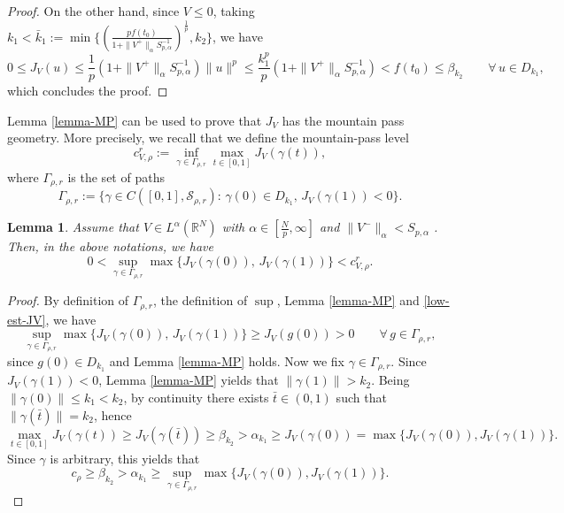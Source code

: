 \documentclass[11pt,reqno]{amsart}
\newtheorem{lemma}[theorem]{Lemma}
\theoremstyle{definition}
\numberwithin{equation}{section}
\numberwithin{theorem}{section}
\numberwithin{equation}{section}
\numberwithin{theorem}{section}
\newcommand{\R}{\mathbb{R}}
\begin{document}
\begin{proof}
On the other hand, since $V\le 0$, taking $k_1<\bar{k}_1:=\min\{(\frac{pf(t_0)}{1+\|V^+\|_\alpha S^{-1}_{p,\alpha}})^{\frac{1}{p}},k_2\}$, we have
\begin{equation}\label{low-est-J}
0\le J_V(u)\le \frac{1}{p}(1+\|V^+\|_\alpha S^{-1}_{p,\alpha})\|u\|^p\le\frac{k_1^p}{p}(1+\|V^+\|_\alpha S^{-1}_{p,\alpha})<f(t_0)\le\beta_{k_2}\qquad\forall\,u\in D_{k_1},    
\end{equation}
which concludes the proof.
\end{proof}
Lemma \ref{lemma-MP} can be used to prove that $J_V$ has the mountain pass geometry. More precisely, we recall that %
we define the mountain-pass level
\begin{equation}
c^r_{V,\rho}:=\inf_{\gamma\in \Gamma_{\rho,r}}\max_{t\in[0,1]}J_V(\gamma(t)),
\end{equation}
where $\Gamma_{\rho,r}$ is the set of paths
$$\Gamma_{\rho,r}:=\{\gamma\in C([0,1],\mathcal{S}_{\rho,r}):\,\gamma(0)\in D_{k_1},\,J_V(\gamma(1))<0\}.$$
\begin{lemma}\label{lemma-mpg}
Assume that $V\in L^{\alpha}(\R^N)$ with $\alpha\in[\frac {N}{p},\infty]$ and $\|V^-\|_{\alpha}<S_{p,\alpha}$%
. Then, in the above notations, we have
$$0<\sup_{\gamma\in\Gamma_{\rho,r}}\max\{J_V(\gamma(0)),\,J_V(\gamma(1))\}<c^r_{V,\rho}.$$
\end{lemma}
\begin{proof}
By definition of $\Gamma_{\rho,r}$, the definition of $\sup$, Lemma \ref{lemma-MP} and \eqref{low-est-JV}, we have $$\sup_{\gamma\in\Gamma_{\rho,r}}\max\{J_V(\gamma(0)),\,J_V(\gamma(1))\}\ge J_V(g(0))>0\qquad\forall\,g\in \Gamma_{\rho,r},$$
since $g(0)\in D_{k_1}$ and Lemma \ref{lemma-MP} holds. Now we fix $\gamma\in\Gamma_{\rho,r}$. Since $J_V(\gamma(1))<0$, Lemma \ref{lemma-MP} yields that $\|\gamma(1)\|>k_2$. Being $\|\gamma(0)\|\le k_1<k_2$, by continuity there exists $\bar{t}\in(0,1)$ such that $\|\gamma(\bar{t})\|=k_2$, hence $$\max_{t\in[0,1]} J_V(\gamma(t))\ge J_V(\gamma(\bar{t}))\ge\beta_{k_2}>\alpha_{k_1}\ge J_V(\gamma(0))=\max\{J_V(\gamma(0)),J_V(\gamma(1))\}.$$  
Since $\gamma$ is arbitrary, this yields that $$c_{\rho}\ge \beta_{k_2}>\alpha_{k_1}\ge\sup_{\gamma\in\Gamma_{\rho,r}}\max\{J_V(\gamma(0)),J_V(\gamma(1))\}.$$
\end{proof}
\end{document}
